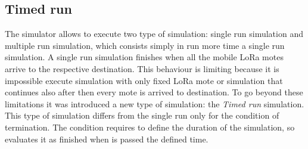 \subsection{Timed run}
The simulator allows to execute two type of simulation: single run simulation and multiple run simulation, which consists simply in run more time a single run simulation. 
A single run simulation finishes when all the mobile LoRa motes arrive to the respective destination. 
This behaviour is limiting because it is impossible execute simulation with only fixed LoRa mote or simulation that continues also after then every mote is arrived to destination. 
To go beyond these limitations it was introduced a new type of simulation: the \textit{Timed run} simulation. 
This type of simulation differs from the single run only for the condition of termination. 
The condition requires to define the duration of the simulation, so evaluates it as finished when is passed the defined time.

